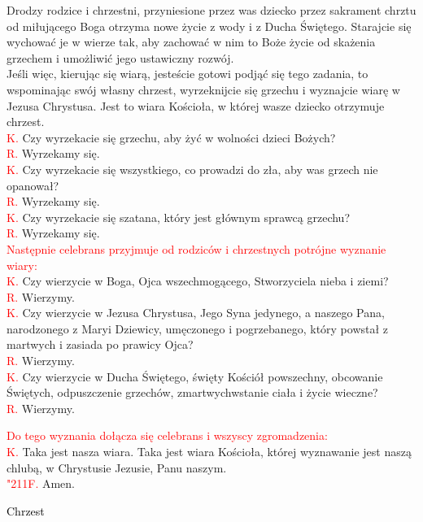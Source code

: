 \documentclass[11pt, a5paper]{extarticle}
\newcommand{\textjuni}[1]{{\fontspec{Junicode}#1}}
\newcommand{\response}{\textcolor{red}{\textjuni{\char"211F. }}}
\begin{document}
Drodzy rodzice i chrzestni, przyniesione przez was dziecko przez sakrament chrztu od miłującego Boga otrzyma nowe życie z wody i z Ducha Świętego. Starajcie się wychować je w wierze tak, aby zachować w nim to Boże życie od skażenia grzechem i umożliwić jego ustawiczny rozwój. \\
Jeśli więc, kierując się wiarą, jesteście gotowi podjąć się tego zadania, to wspominając swój własny chrzest, wyrzeknijcie się grzechu i wyznajcie wiarę w Jezusa Chrystusa. Jest to wiara Kościoła, w której wasze dziecko otrzymuje chrzest.\\
\textcolor{red}{K.} Czy wyrzekacie się grzechu, aby żyć w wolności dzieci Bożych?  \\
\textcolor{red}{R.} Wyrzekamy się. \\
\textcolor{red}{K.} Czy wyrzekacie się wszystkiego, co prowadzi do zła, aby was grzech nie opanował?  \\
\textcolor{red}{R.} Wyrzekamy się. \\
\textcolor{red}{K.} Czy wyrzekacie się szatana, który jest głównym sprawcą grzechu?  \\
\textcolor{red}{R.} Wyrzekamy się. \\
\textcolor{red}{Następnie celebrans przyjmuje od rodziców i chrzestnych potrójne wyznanie wiary:} \\
\textcolor{red}{K.} Czy wierzycie w Boga, Ojca wszechmogącego, Stworzyciela nieba i ziemi?  \\
\textcolor{red}{R.} Wierzymy. \\
\textcolor{red}{K.} Czy wierzycie w Jezusa Chrystusa, Jego Syna jedynego, a naszego Pana, narodzonego z Maryi Dziewicy, umęczonego i pogrzebanego, który powstał z martwych i zasiada po prawicy Ojca?  \\
\textcolor{red}{R.} Wierzymy. \\
\textcolor{red}{K.} Czy wierzycie w Ducha Świętego, święty Kościół powszechny, obcowanie Świętych, odpuszczenie grzechów, zmartwychwstanie ciała i życie wieczne?  \\
\textcolor{red}{R.} Wierzymy.

\textcolor{red}{Do tego wyznania dołącza się celebrans i wszyscy zgromadzenia:} \\
\textcolor{red}{K.} Taka jest nasza wiara. Taka jest wiara Kościoła, której wyznawanie jest naszą chlubą, w Chrystusie Jezusie, Panu naszym. \\
\response Amen.
\begin{center}
\Large
\textcolor{black}{Chrzest}
\end{center}
\end{document}
